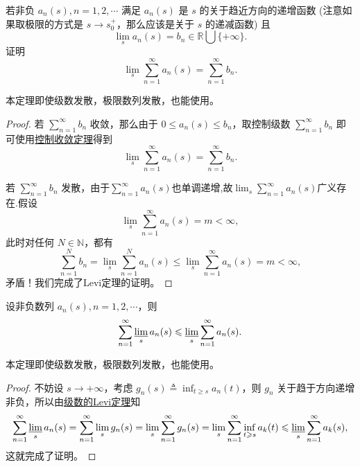 \documentclass[../../main.tex]{subfiles}%
\begin{document}
\begin{theorem}[级数的Levi定理]\label{theorem:级数的Levi定理}
若非负 \( a_n(s), n = 1, 2, \cdots \) 满足 \( a_n(s) \) 是 \( s \) 的关于趋近方向的递增函数 (注意如果取极限的方式是 \( s \to s_0^+ \)，那么应该是关于 \( s \) 的递减函数) 且
\[
\lim_{s} a_n(s) = b_n \in \mathbb{R} \bigcup \{+\infty\}.
\]
证明
\[
\lim_{s} \sum_{n = 1}^{\infty} a_n(s) = \sum_{n = 1}^{\infty} b_n.
\]
\end{theorem}
\begin{note}
本定理即使级数发散，极限数列发散，也能使用。
\end{note}
\begin{proof}

若 \( \sum_{n = 1}^{\infty} b_n \) 收敛，那么由于 \( 0 \leqslant a_n(s) \leqslant b_n \)，取控制级数 \( \sum_{n = 1}^{\infty} b_n \) 即可使用\hyperref[theorem:级数的控制收敛定理]{控制收敛定理}得到
\[
\lim_{s} \sum_{n = 1}^{\infty} a_n(s) = \sum_{n = 1}^{\infty} b_n.
\]

若 \( \sum_{n = 1}^{\infty} b_n \) 发散，由于$\sum_{n = 1}^{\infty} a_n(s)$也单调递增,故$\lim_{s} \sum_{n = 1}^{\infty} a_n(s) $广义存在.假设
\[
\lim_{s} \sum_{n = 1}^{\infty} a_n(s) = m < \infty,
\]
此时对任何 \( N \in \mathbb{N} \)，都有
\[
\sum_{n = 1}^{N} b_n = \lim_{s} \sum_{n = 1}^{N} a_n(s) \leqslant \lim_{s} \sum_{n = 1}^{\infty} a_n(s) = m < \infty,
\]
矛盾！我们完成了Levi定理的证明。

\end{proof}

\begin{lemma}[级数的Fatou引理]\label{lemma:级数的Fatou引理}
设非负数列 \( a_n(s), n = 1, 2, \cdots \)，则
\[
\sum_{n = 1}^{\infty} \varliminf_{s} a_n(s) \leqslant \varliminf_{s} \sum_{n = 1}^{\infty} a_n(s).
\]
\end{lemma}
\begin{note}
本定理即使级数发散，极限数列发散，也能使用。
\end{note}
\begin{proof}

不妨设 \( s \to +\infty \)，考虑 \( g_n(s) \triangleq \inf_{t \geqslant s} a_n(t) \)，则 \( g_n \) 关于趋于方向递增非负，所以由\hyperref[theorem:级数的Levi定理]{级数的Levi定理}知
\[
\sum_{n = 1}^{\infty} \varliminf_{s} a_n(s) = \sum_{n = 1}^{\infty} \lim_{s} g_n(s) = \lim_{s} \sum_{n = 1}^{\infty} g_n(s) = \lim_{s} \sum_{n = 1}^{\infty} \inf_{t \geqslant s} a_k(t) \leqslant \varliminf_{s} \sum_{n = 1}^{\infty} a_k(s),
\]
这就完成了证明。

\end{proof}
\end{document}
